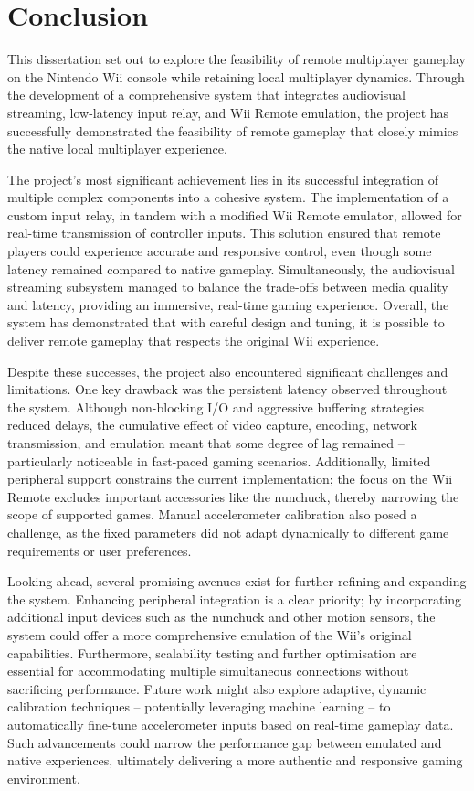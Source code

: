 \chapter{Conclusion}
\label{chapter:conclusion}

This dissertation set out to explore the feasibility of remote multiplayer
gameplay on the Nintendo Wii console while retaining local multiplayer dynamics.
Through the development of a comprehensive system that integrates audiovisual
streaming, low-latency input relay, and Wii Remote emulation, the project has
successfully demonstrated the feasibility of remote gameplay that closely mimics
the native local multiplayer experience.

The project’s most significant achievement lies in its successful integration of
multiple complex components into a cohesive system. The implementation of a
custom input relay, in tandem with a modified Wii Remote emulator, allowed for
real-time transmission of controller inputs. This solution ensured that remote
players could experience accurate and responsive control, even though some
latency remained compared to native gameplay. Simultaneously, the audiovisual
streaming subsystem managed to balance the trade-offs between media quality and
latency, providing an immersive, real-time gaming experience. Overall, the
system has demonstrated that with careful design and tuning, it is possible to
deliver remote gameplay that respects the original Wii experience.

Despite these successes, the project also encountered significant challenges and
limitations. One key drawback was the persistent latency observed throughout the
system. Although non-blocking I/O and aggressive buffering strategies reduced
delays, the cumulative effect of video capture, encoding, network transmission,
and emulation meant that some degree of lag remained -- particularly noticeable
in fast-paced gaming scenarios. Additionally, limited peripheral support
constrains the current implementation; the focus on the Wii Remote excludes
important accessories like the nunchuck, thereby narrowing the scope of
supported games. Manual accelerometer calibration also posed a challenge, as the
fixed parameters did not adapt dynamically to different game requirements or
user preferences.

Looking ahead, several promising avenues exist for further refining and
expanding the system. Enhancing peripheral integration is a clear priority; by
incorporating additional input devices such as the nunchuck and other motion
sensors, the system could offer a more comprehensive emulation of the Wii’s
original capabilities. Furthermore, scalability testing and further optimisation
are essential for accommodating multiple simultaneous connections without
sacrificing performance. Future work might also explore adaptive, dynamic
calibration techniques -- potentially leveraging machine learning -- to
automatically fine-tune accelerometer inputs based on real-time gameplay data.
Such advancements could narrow the performance gap between emulated and native
experiences, ultimately delivering a more authentic and responsive gaming
environment.

